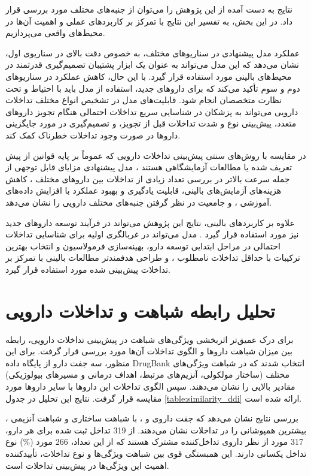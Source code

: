 نتایج به دست آمده از این پژوهش را می‌توان از جنبه‌های مختلف مورد بررسی قرار داد. در این بخش، به تفسیر این نتایج با تمرکز بر کاربردهای عملی و اهمیت آن‌ها در محیط‌های واقعی می‌پردازیم.

عملکرد مدل پیشنهادی در سناریوهای مختلف، به خصوص دقت بالای  در سناریوی اول، نشان می‌دهد که این مدل می‌تواند به عنوان یک ابزار پشتیبان تصمیم‌گیری قدرتمند در محیط‌های بالینی مورد استفاده قرار گیرد. با این حال، کاهش عملکرد در سناریوهای دوم و سوم تأکید می‌کند که برای داروهای جدید، استفاده از مدل باید با احتیاط و تحت نظارت متخصصان انجام شود. قابلیت‌های مدل در تشخیص انواع مختلف تداخلات دارویی می‌تواند به پزشکان در شناسایی سریع تداخلات احتمالی هنگام تجویز داروهای متعدد، پیش‌بینی نوع و شدت تداخلات قبل از تجویز، و تصمیم‌گیری در مورد جایگزینی داروها در صورت وجود تداخلات خطرناک کمک کند.

در مقایسه با روش‌های سنتی پیش‌بینی تداخلات دارویی که عموماً بر پایه قوانین از پیش تعریف شده یا مطالعات آزمایشگاهی هستند \cite{ref_glintborg2005}، مدل پیشنهادی مزایای قابل توجهی از جمله سرعت بالاتر در بررسی تعداد زیادی از تداخلات بین داروهای مختلف \cite{ref_cascorbi2012}، کاهش هزینه‌های آزمایش‌های بالینی، قابلیت یادگیری و بهبود عملکرد با افزایش داده‌های آموزشی \cite{ref_he2023}، و جامعیت در نظر گرفتن جنبه‌های مختلف دارویی را نشان می‌دهد.

علاوه بر کاربردهای بالینی، نتایج این پژوهش می‌تواند در فرآیند توسعه داروهای جدید نیز مورد استفاده قرار گیرد \cite{ref_ryu2018}. مدل می‌تواند در غربالگری اولیه برای شناسایی تداخلات احتمالی در مراحل ابتدایی توسعه دارو، بهینه‌سازی فرمولاسیون و انتخاب بهترین ترکیبات با حداقل تداخلات نامطلوب \cite{ref_huang2013}، و طراحی هدفمندتر مطالعات بالینی با تمرکز بر تداخلات پیش‌بینی شده مورد استفاده قرار گیرد.

\section{تحلیل رابطه شباهت و تداخلات دارویی}

برای درک عمیق‌تر اثربخشی ویژگی‌های شباهت در پیش‌بینی تداخلات دارویی، رابطه بین میزان شباهت داروها و الگوی تداخلات آن‌ها مورد بررسی قرار گرفت. برای این منظور، سه جفت دارو از پایگاه داده DrugBank انتخاب شدند که در شباهت ویژگی‌های مختلف (ساختار مولکولی، آنزیم‌های مرتبط، اهداف درمانی و مسیرهای بیولوژیکی) مقادیر بالایی را نشان می‌دهند. سپس الگوی تداخلات این داروها با سایر داروها مورد مقایسه قرار گرفت. نتایج این تحلیل در جدول \ref{table:similarity_ddi} ارائه شده است.

بررسی نتایج نشان می‌دهد که جفت داروی  و ، با شباهت ساختاری  و شباهت آنزیمی ، بیشترین همپوشانی را در تداخلات نشان می‌دهند. از 319 تداخل ثبت شده برای هر دارو، 317 مورد از نظر داروی تداخل‌کننده مشترک هستند که از این تعداد، 266 مورد (\%) نوع تداخل یکسانی دارند. این همبستگی قوی بین شباهت ویژگی‌ها و نوع تداخلات، تأییدکننده اهمیت این ویژگی‌ها در پیش‌بینی تداخلات است.

